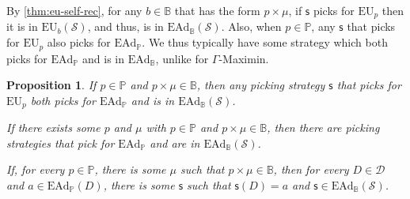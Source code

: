 \documentclass[a4paper]{article}
\newtheorem{proposition}[theorem]{Proposition}
\renewcommand\P{\mathbb{P}} %
\newcommand\EU{\mathrm{EU}}
\newcommand\EAd{\mathrm{EAd}}
\newcommand{\D}{\mathcal{D}}
\newcommand{\Decs}{\mathcal{D}}
\renewcommand\S{\mathcal{S}}
\newcommand\s{\mathsf{s}}
\newcommand{\IB}{\mathbb{B}}
\newcommand{\IP}{\P}
\renewcommand{\color}[1]{}
\newenvironment{colored}[1]{\leavevmode\color{#1}}{}
\newcommand{\Strategies}{\S}
\newenvironment{CCM rewritten}
{\begingroup\color{blue}} %
{\endgroup}              %
\begin{document}
By \cref{thm:eu-self-rec}, for any $b\in\IB$ that has the form $p\times\mu$, if $\s$ picks for $\EU_p$ then it is in $\EU_{b}(\S)$, and thus, is in $\EAd_\IB(\S)$. Also, when $p\in\IP$, any $\s$ that picks for $\EU_p$ also picks for $\EAd_\IP$. We thus typically have some strategy which both picks for $\EAd_\IP$ and is in $\EAd_\IB$, unlike for $\Gamma$-Maximin. 
 \begin{proposition}\label{thm:ead-existence[indep]}
	If $p\in\IP$ and $p\times\mu\in\IB$, then any picking strategy $\s$ that picks for $\EU_p$ both picks for $\EAd_\IP$ and is in $\EAd_\IB(\S)$. 
	
	If there exists some $p$ and $\mu$ with $p\in\IP$ and $p\times\mu\in\IB$, then there are picking strategies that pick for $\EAd_\IP$ and are in $\EAd_\IB(\S)$. 
	
	If, for every $p\in\IP$, there is some $\mu$ such that $p\times\mu\in\IB$, then for every $D\in\Decs$ and $a\in\EAd_\IP(D)$, there is some $\s$ such that $\s(D)=a$ and $\s\in\EAd_\IB(\S)$. 
\end{proposition}



	

 		
 
\end{document}

